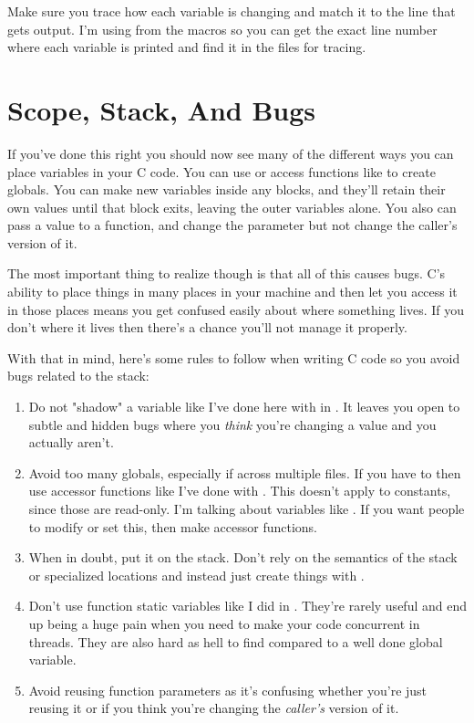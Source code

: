 Make sure you trace how each variable is changing and match it to the line
that gets output.  I'm using  from the  macros
so you can get the exact line number where each variable is printed and
find it in the files for tracing.

\section{Scope, Stack, And Bugs}

If you've done this right you should now see many of the different ways
you can place variables in your C code.  You can use  or
access functions like  to create globals.  You can make
new variables inside any blocks, and they'll retain their own values until
that block exits, leaving the outer variables alone.  You also can pass
a value to a function, and change the parameter but not change the caller's
version of it.

The most important thing to realize though is that all of this causes
bugs.  C's ability to place things in many places in your machine and then
let you access it in those places means you get confused easily about
where something lives.  If you don't where it lives then there's a chance
you'll not manage it properly.

With that in mind, here's some rules to follow when writing C code
so you avoid bugs related to the stack:

\begin{enumerate}
\item Do not "shadow" a variable like I've done here with 
    in .  It leaves you open to subtle and hidden bugs
    where you \emph{think} you're changing a value and you actually aren't.
\item Avoid too many globals, especially if across multiple files.  If you have
    to then use accessor functions like I've done with .  This
    doesn't apply to constants, since those are read-only.  I'm talking about
    variables like .  If you want people to modify or set this,
    then make accessor functions.
\item When in doubt, put it on the stack.  Don't rely on the semantics of the
    stack or specialized locations and instead just create things with
    .
\item Don't use function static variables like I did in .
    They're rarely useful and end up being a huge pain when you need to make
    your code concurrent in threads.  They are also hard as hell to find compared
    to a well done global variable.
\item Avoid reusing function parameters as it's confusing whether you're 
    just reusing it or if you think you're changing the \emph{caller's}
    version of it.
\end{enumerate}

